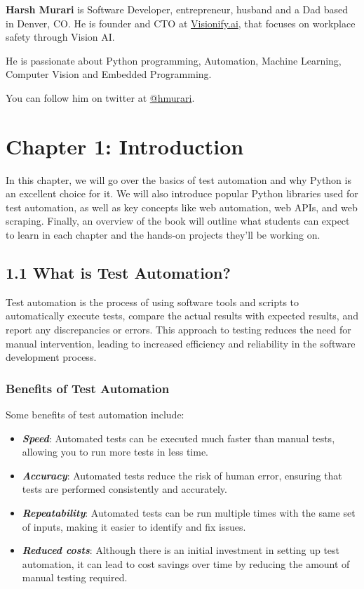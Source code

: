\documentclass[
  paper=a4,
  ,captions=tableheading
]{scrartcl}
\providecommand{\tightlist}{%
  \setlength{\itemsep}{0pt}\setlength{\parskip}{0pt}}
\begin{document}
\textbf{Harsh Murari} is Software Developer, entrepreneur, husband and a
Dad based in Denver, CO. He is founder and CTO at
\href{https://visionify.ai}{Visionify.ai}, that focuses on workplace
safety through Vision AI.

He is passionate about Python programming, Automation, Machine Learning,
Computer Vision and Embedded Programming.

You can follow him on twitter at
\href{https://twitter.com/hmurari}{@hmurari}.

\hypertarget{chapter-1-introduction}{%
\chapter{Chapter 1: Introduction}\label{chapter-1-introduction}}

In this chapter, we will go over the basics of test automation and why
Python is an excellent choice for it. We will also introduce popular
Python libraries used for test automation, as well as key concepts like
web automation, web APIs, and web scraping. Finally, an overview of the
book will outline what students can expect to learn in each chapter and
the hands-on projects they'll be working on.

\hypertarget{what-is-test-automation}{%
\section{1.1 What is Test Automation?}\label{what-is-test-automation}}

Test automation is the process of using software tools and scripts to
automatically execute tests, compare the actual results with expected
results, and report any discrepancies or errors. This approach to
testing reduces the need for manual intervention, leading to increased
efficiency and reliability in the software development process.

\hypertarget{benefits-of-test-automation}{%
\subsection{Benefits of Test
Automation}\label{benefits-of-test-automation}}

Some benefits of test automation include:

\begin{itemize}
\tightlist
\item
  \textbf{\emph{Speed}}: Automated tests can be executed much faster
  than manual tests, allowing you to run more tests in less time.
\item
  \textbf{\emph{Accuracy}}: Automated tests reduce the risk of human
  error, ensuring that tests are performed consistently and accurately.
\item
  \textbf{\emph{Repeatability}}: Automated tests can be run multiple
  times with the same set of inputs, making it easier to identify and
  fix issues.
\item
  \textbf{\emph{Reduced costs}}: Although there is an initial investment
  in setting up test automation, it can lead to cost savings over time
  by reducing the amount of manual testing required.
\end{itemize}
\end{document}
